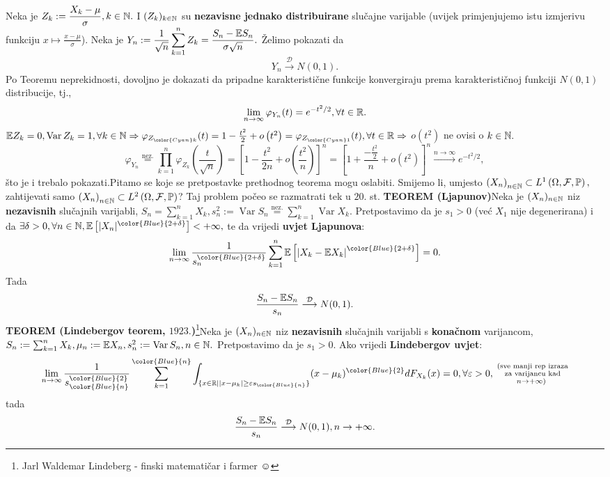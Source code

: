 \documentclass{article}
\newcommand{\Var}{\operatorname{Var}}
\begin{document}
Neka je \(Z_k:=\dfrac{X_k-\mu}\sigma,k\in\Bbb N.\) I \((Z_k)_{k\in\Bbb N}\) su \textbf{nezavisne jednako distribuirane} slučajne varijable (uvijek primjenjujemo istu izmjerivu funkciju \(x\mapsto\frac{x-\mu}\sigma\)). Neka je \(\displaystyle Y_n:=\frac1{\sqrt n}\sum_{k=1}^nZ_k=\frac{S_n-\Bbb ES_n}{\sigma\sqrt n}.\) Želimo pokazati da \[Y_n\overset{\mathcal D}{\longrightarrow}N(0,1).\] Po Teoremu neprekidnosti, dovoljno je dokazati da pripadne karakteristične funkcije konvergiraju prema karakterističnoj funkciji \(N(0,1)\) distribucije, tj., \[\lim_{n\to\infty}\varphi_{Y_n}(t)=e^{-t^2/2},\forall t\in\Bbb R.\] \(\Bbb EZ_k=0,\Var Z_k=1,\forall k\in\Bbb N\Rightarrow\varphi_{Z_{\color{Cyan}k}}(t)=1-\frac{t^2}2+o\left(t^2\right)=\varphi_{Z_{\color{Cyan}1}}(t),\forall t\in\Bbb R\Rightarrow\) \(o(t^2)\) ne ovisi o \(k\in\Bbb N.\) \[\varphi_{Y_n}\overset{\text{nez.}}{=}\prod_{k=1}^n\varphi_{Z_k}\left(\frac{t}{\sqrt n}\right)=\left[1-\frac{t^2}{2n}+o\left(\frac{t^2}n\right)\right]^n=\left[1+\frac{-\frac{t^2}2}n+o\left(t^2\right)\right]^n\overset{n\to\infty}{\longrightarrow}e^{-t^2/2},\] što je i trebalo pokazati.\newline\newline Pitamo se koje se pretpostavke prethodnog teorema mogu oslabiti. Smijemo li, umjesto \newline \(\left(X_n\right)_{n\in\Bbb N}\subset L^1\left(\Omega,\mathcal F,\Bbb P\right),\) zahtijevati samo \(\left(X_n\right)_{n\in\Bbb N}\subset L^2\left(\Omega,\mathcal F,\Bbb P\right)\)? Taj problem počeo se razmatrati tek u  \(20.\) st.\newline\newline
\textbf{TEOREM (Ljapunov)}\newline Neka je \((X_n)_{n\in\Bbb N}\) niz \textbf{nezavisnih} slučajnih varijabli, \(\displaystyle S_n=\sum_{k=1}^nX_k, s_n^2:=\Var S_n\overset{\text{nez.}}{=}\sum_{k=1}^n\Var X_k.\) Pretpostavimo da je \(s_1>0\) (već \(X_1\) nije degenerirana) i da \(\exists\delta>0,\forall n\in\Bbb N,\Bbb E\left[|X_n|^{\color{Blue}{2+\delta}}\right]<+\infty,\) te da vrijedi \textbf{uvjet Ljapunova}: \[\lim_{n\to\infty}\frac1{s_n^{\color{Blue}{2+\delta}}}\sum_{k=1}^n\Bbb E\left[\left|X_k-\Bbb EX_k\right|^{\color{Blue}{2+\delta}}\right]=0.\] Tada \[\frac{S_n-\Bbb ES_n}{s_n}\overset{\mathcal D}{\longrightarrow}N(0,1).\]
\textbf{TEOREM (Lindebergov teorem, \(1923.\))}\footnote[34]{Jarl Waldemar Lindeberg - finski matematičar i farmer \(\smiley\)}\newline Neka je \((X_n)_{n\in\Bbb N}\) niz \textbf{nezavisnih} slučajnih varijabli s \textbf{konačnom} varijancom,\newline \(S_n:=\sum_{k=1}^nX_k,\mu_n:=\Bbb EX_n,s_n^2:=\Var S_n,n\in\Bbb N.\) Pretpostavimo da je \(s_1>0.\)  Ako vrijedi \textbf{Lindebergov uvjet}: \[\lim_{n\to\infty}\frac1{s_{{\color{Blue}{n}}}^{\color{Blue}{2}}}\sum_{k=1}^{{\color{Blue}{n}}}\int_{\{x\in\Bbb R\mid |x-\mu_k|\ge\varepsilon s_{\color{Blue}{n}}\}}(x-\mu_k)^{\color{Blue}{2}}dF_{X_k}(x)=0,\forall\varepsilon>0,\substack{\text{ (sve manji rep izraza}\\\text{ za varijancu kad}\\n\to+\infty\text{)}}\] tada \[\frac{S_n-\Bbb ES_n}{s_n}\overset{\mathcal D}{\longrightarrow}N(0,1),n\to+\infty.\]
\end{document}

